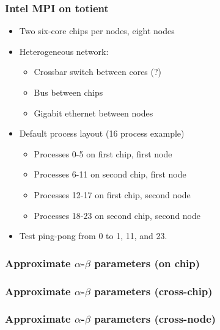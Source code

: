 \documentclass{beamer}
\begin{document}
\begin{frame}
  \frametitle{Intel MPI on totient}

  \begin{itemize}
  \item Two six-core chips per nodes, eight nodes
  \item Heterogeneous network:
    \begin{itemize}
    \item Crossbar switch between cores (?)
    \item Bus between chips
    \item Gigabit ethernet between nodes
    \end{itemize}
  \item Default process layout (16 process example)
    \begin{itemize}
    \item Processes 0-5 on first chip, first node
    \item Processes 6-11 on second chip, first node
    \item Processes 12-17 on first chip, second node
    \item Processes 18-23 on second chip, second node
    \end{itemize}
  \item Test ping-pong from 0 to 1, 11, and 23.
  \end{itemize}

\end{frame}


\begin{frame}
  \frametitle{Approximate $\alpha$-$\beta$ parameters (on chip)}

  \begin{center}
    
  \end{center}
\end{frame}


\begin{frame}
  \frametitle{Approximate $\alpha$-$\beta$ parameters (cross-chip)}

  \begin{center}
    
  \end{center}
\end{frame}


\begin{frame}
  \frametitle{Approximate $\alpha$-$\beta$ parameters (cross-node)}

  \begin{center}
    
  \end{center}
\end{frame}
\end{document}
